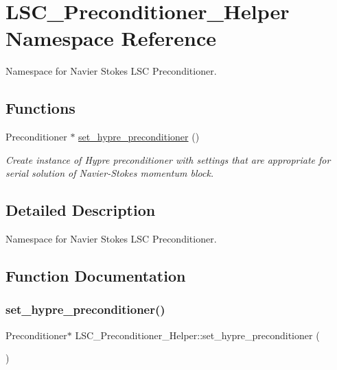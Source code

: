 \hypertarget{namespaceLSC__Preconditioner__Helper}{}\section{L\+S\+C\+\_\+\+Preconditioner\+\_\+\+Helper Namespace Reference}
\label{namespaceLSC__Preconditioner__Helper}


Namespace for Navier Stokes L\+SC Preconditioner.  


\subsection*{Functions}
\begin{DoxyCompactItemize}
\item 
Preconditioner $\ast$ \hyperlink{namespaceLSC__Preconditioner__Helper_a3191fa949eda009c481fdf4f81516535}{set\+\_\+hypre\+\_\+preconditioner} ()
\begin{DoxyCompactList}\small\item\em Create instance of Hypre preconditioner with settings that are appropriate for serial solution of Navier-\/\+Stokes momentum block. \end{DoxyCompactList}\end{DoxyCompactItemize}


\subsection{Detailed Description}
Namespace for Navier Stokes L\+SC Preconditioner. 

\subsection{Function Documentation}
\mbox{\label{namespaceLSC__Preconditioner__Helper_a3191fa949eda009c481fdf4f81516535}} 
\subsubsection{\texorpdfstring{set\+\_\+hypre\+\_\+preconditioner()}{set\_hypre\_preconditioner()}}
{\footnotesize\ttfamily Preconditioner$\ast$ L\+S\+C\+\_\+\+Preconditioner\+\_\+\+Helper\+::set\+\_\+hypre\+\_\+preconditioner (\begin{DoxyParamCaption}{ }\end{DoxyParamCaption})}



